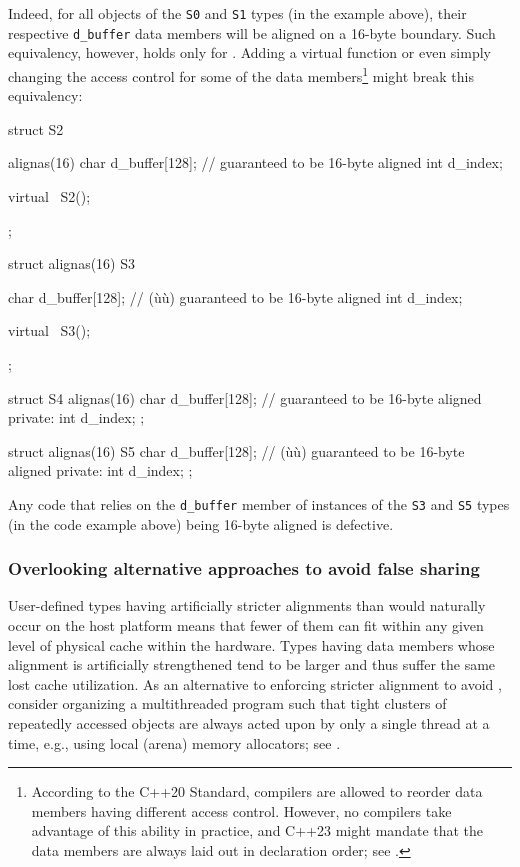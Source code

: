 Indeed, for all objects of the \lstinline!S0! and \lstinline!S1! types (in the example above), their respective \lstinline!d_buffer! data members will be aligned on a 16-byte boundary. Such equivalency, however, holds only for .  Adding a virtual function or even simply changing the access control for some of the data members\footnote{According to the C++20 Standard, compilers are allowed to reorder data members having different access control.  However, no compilers take advantage of this ability in practice, and C++23 might mandate that the data members are always laid out in declaration order; see \cite{balog20}.} might break this equivalency:

\begin{emcppslisting}
struct S2 {
    alignas(16) char d_buffer[128];  // guaranteed to be 16-byte aligned
                int  d_index;

    virtual ~S2();
};

struct alignas(16) S3 {
    char d_buffer[128];              // (ù{}ù) guaranteed to be 16-byte aligned
    int  d_index;

    virtual ~S3();
};

struct S4 {
    alignas(16) char d_buffer[128];  // guaranteed to be 16-byte aligned
private:
                int  d_index;
};

struct alignas(16) S5 {
    char d_buffer[128];              // (ù{}ù) guaranteed to be 16-byte aligned
private:
    int  d_index;
};
\end{emcppslisting}

Any code that relies on the \lstinline!d_buffer! member of instances of the \lstinline!S3! and \lstinline!S5! types (in the code example above) being 16-byte aligned is defective.

\subsubsection[Overlooking alternative approaches to avoid false sharing]{Overlooking alternative approaches to avoid false sharing}\label{stricter-alignment-might-reduce-cache-utilization}\label{overlooking-alternative-approaches-to-avoid-false-sharing}

User-defined types having artificially stricter alignments than would
naturally occur on the host platform means that fewer of them can fit
within any given level of physical cache within the hardware. Types
having data members whose alignment is artificially strengthened tend to be
larger and thus suffer the same lost cache utilization. As an
alternative to enforcing stricter alignment to avoid , consider organizing a multithreaded program such that tight
clusters of repeatedly accessed objects are always acted upon by only a
single thread at a time, e.g., using local (arena) memory allocators;
see .

